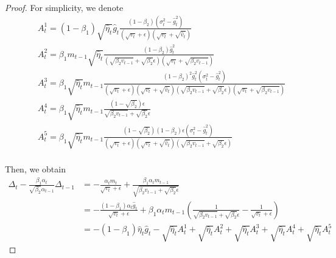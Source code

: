 \begin{proof}
For simplicity, we denote 
\[
\begin{split}
    &A_t^1 = \left(1-\beta_1\right)\sqrt{\hat{\eta}_t}\hat{g}_t\frac{\left(1-\beta_2\right)\left(\sigma_t^2-\hat{g}_t^2\right)}{\left(\sqrt{v_t}+\epsilon\right)\left(\sqrt{v_t} + \sqrt{\hat{v}_t}\right)}\\
    &A_t^2 = \beta_1m_{t-1}\sqrt{\hat{\eta}_t}\frac{\left(1-\beta_2\right)\hat{g}_t^2}{\left(\sqrt{\beta_2 v_{t-1}} + \sqrt{\beta_2}\epsilon\right)\left(\sqrt{v_t} + \sqrt{\beta_2 v_{t-1}}\right)}\\
    &A_t^3 = \beta_1\sqrt{\hat{\eta}_t}m_{t-1}\frac{(1-\beta_2)^2\hat{g}_t^2(\sigma_t^2 -\hat{g}_t^2)}{(\sqrt{v_t}+\epsilon)(\sqrt{v_t} + \sqrt{\hat{v}_t})(\sqrt{\beta_2v_{t-1}} +\sqrt{\beta_2}\epsilon)(\sqrt{v_t} + \sqrt{\beta_2v_{t-1}})}\\
    &A_t^4 = \beta_1 \sqrt{\hat{\eta}_t} m_{t-1}\frac{(1-\sqrt{\beta_2})\epsilon}{\sqrt{\beta_2 v_{t-1}} + \sqrt{\beta_2}\epsilon}\\
    &A_t^5 = \beta_1\sqrt{\hat{\eta}_t}m_{t-1}\frac{(1-\sqrt{\beta_2})(1-\beta_2)\epsilon(\sigma_t^2 - \hat{g}_t^2)}{(\sqrt{v_t} + \epsilon)(\sqrt{v_t} + \sqrt{\hat{v}_t})(\sqrt{\beta_2v_{t-1}} + \sqrt{\beta_2}\epsilon)}\\
\end{split}
\]


Then, we obtain
\[
\begin{split}
    \Delta_t - \frac{\beta_1 \alpha_t}{\sqrt{\beta_2}\alpha_{t-1}}\Delta_{t-1} &= -\frac{\alpha_tm_t}{\sqrt{v_t} +\epsilon} + \frac{\beta_1\alpha_t m_{t-1}}{\sqrt{\beta_2 v_{t-1} + \sqrt{\beta_2}\epsilon}}\\
     &= -\frac{(1-\beta_1) \alpha_t \hat{g}_t}{\sqrt{v_t} + \epsilon} + \beta_1 \alpha_t m_{t-1} \left(\frac{1}{\sqrt{\beta_2v_{t-1}}+\sqrt{\beta_2}\epsilon} - \frac{1}{\sqrt{v_t} + \epsilon}\right)\\
     & = -(1-\beta_1)\hat{\eta}_{t} \hat{g}_t -\sqrt{\hat{\eta}_t}A_{t}^1 +\sqrt{\hat{\eta}_t} A_t^2+\sqrt{\hat{\eta}_t} A_t^3+ \sqrt{\hat{\eta}_t}A_t^4+\sqrt{\hat{\eta}_t} A_t^5
\end{split}
\]


\end{proof}
